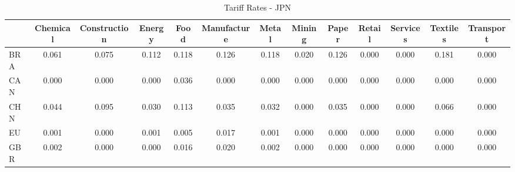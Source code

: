 \begin{table}[htbp]
\centering
\caption{Tariff Rates - JPN} 
\label{tab:tariffs_JPN}
\begin{tabular}{lcccccccccccc}
  \hline
 & Chemical & Construction & Energy & Food & Manufacture & Metal & Mining & Paper & Retail & Services & Textiles & Transport \\ 
  \hline
BRA & \textcolor[RGB]{32,21,223}{0.061} & \textcolor[RGB]{25,16,230}{0.075} & \textcolor[RGB]{19,12,236}{0.112} & \textcolor[RGB]{13,8,242}{0.118} & \textcolor[RGB]{8,5,246}{0.126} & \textcolor[RGB]{15,10,240}{0.118} & \textcolor[RGB]{79,51,176}{0.020} & \textcolor[RGB]{11,7,244}{0.126} & \textcolor[RGB]{255,165,0}{0.000} & \textcolor[RGB]{255,165,0}{0.000} & \textcolor[RGB]{2,1,253}{0.181} & \textcolor[RGB]{255,165,0}{0.000} \\ 
  CAN & \textcolor[RGB]{255,165,0}{0.000} & \textcolor[RGB]{255,165,0}{0.000} & \textcolor[RGB]{255,165,0}{0.000} & \textcolor[RGB]{47,30,208}{0.036} & \textcolor[RGB]{117,76,138}{0.000} & \textcolor[RGB]{255,165,0}{0.000} & \textcolor[RGB]{255,165,0}{0.000} & \textcolor[RGB]{255,165,0}{0.000} & \textcolor[RGB]{255,165,0}{0.000} & \textcolor[RGB]{255,165,0}{0.000} & \textcolor[RGB]{255,165,0}{0.000} & \textcolor[RGB]{255,165,0}{0.000} \\ 
  CHN & \textcolor[RGB]{40,26,215}{0.044} & \textcolor[RGB]{21,14,234}{0.095} & \textcolor[RGB]{59,38,196}{0.030} & \textcolor[RGB]{17,11,238}{0.113} & \textcolor[RGB]{53,34,202}{0.035} & \textcolor[RGB]{57,37,198}{0.032} & \textcolor[RGB]{255,165,0}{0.000} & \textcolor[RGB]{51,33,204}{0.035} & \textcolor[RGB]{255,165,0}{0.000} & \textcolor[RGB]{255,165,0}{0.000} & \textcolor[RGB]{30,19,225}{0.066} & \textcolor[RGB]{255,165,0}{0.000} \\ 
  EU & \textcolor[RGB]{110,72,144}{0.001} & \textcolor[RGB]{255,165,0}{0.000} & \textcolor[RGB]{108,70,147}{0.001} & \textcolor[RGB]{98,63,157}{0.005} & \textcolor[RGB]{85,55,170}{0.017} & \textcolor[RGB]{113,73,142}{0.001} & \textcolor[RGB]{255,165,0}{0.000} & \textcolor[RGB]{255,165,0}{0.000} & \textcolor[RGB]{255,165,0}{0.000} & \textcolor[RGB]{255,165,0}{0.000} & \textcolor[RGB]{255,165,0}{0.000} & \textcolor[RGB]{255,165,0}{0.000} \\ 
  GBR & \textcolor[RGB]{102,66,153}{0.002} & \textcolor[RGB]{255,165,0}{0.000} & \textcolor[RGB]{115,74,140}{0.000} & \textcolor[RGB]{87,56,168}{0.016} & \textcolor[RGB]{81,52,174}{0.020} & \textcolor[RGB]{102,66,153}{0.002} & \textcolor[RGB]{255,165,0}{0.000} & \textcolor[RGB]{255,165,0}{0.000} & \textcolor[RGB]{255,165,0}{0.000} & \textcolor[RGB]{255,165,0}{0.000} & \textcolor[RGB]{255,165,0}{0.000} & \textcolor[RGB]{255,165,0}{0.000} \\ 

\end{tabular}
\end{table}
